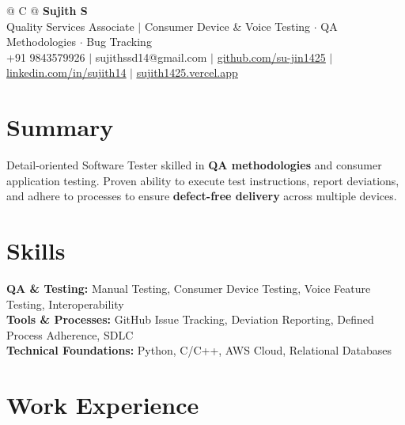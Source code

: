 \documentclass[a4paper,10pt]{article}
\newcommand{\ulink}[2]{\href{#1}{\uline{#2}}}
\begin{document}
\pagestyle{empty}

\begin{tabularx}{\linewidth}{@{} C @{}}
{\color[HTML]{000000}\fontsize{30}{35}\selectfont\bfseries Sujith S} \\[5pt]
{\fontsize{10.5}{12.5}\selectfont\color[HTML]{3A3A3A}
Quality Services Associate $|$ Consumer Device \& Voice Testing $\cdot$ QA Methodologies $\cdot$ Bug Tracking} \\[6pt]
{\fontsize{9.5}{11.5}\selectfont\textcolor[HTML]{3A3A3A}{+91 9843579926 $|$ sujithssd14@gmail.com $|$ \ulink{https://github.com/su-jin1425}{github.com/su-jin1425} $|$ \ulink{https://linkedin.com/in/sujith14}{linkedin.com/in/sujith14} $|$ \ulink{https://sujith1425.vercel.app}{sujith1425.vercel.app}}}
\end{tabularx}

\vspace{2pt}

\section{Summary}
\vspace{1pt}
{\color[HTML]{0A0A0A}\fontsize{11}{14}\selectfont
Detail-oriented Software Tester skilled in \textbf{QA methodologies} and consumer application testing. Proven ability to execute test instructions, report deviations, and adhere to processes to ensure \textbf{defect-free delivery} across multiple devices.}

\vspace{1pt}

\section{Skills}
\vspace{1pt}
{\color[HTML]{0A0A0A}\fontsize{11}{14}\selectfont
\textbf{QA \& Testing:} Manual Testing, Consumer Device Testing, Voice Feature Testing, Interoperability \\[2pt]
\textbf{Tools \& Processes:} GitHub Issue Tracking, Deviation Reporting, Defined Process Adherence, SDLC \\[2pt]
\textbf{Technical Foundations:} Python, C/C++, AWS Cloud, Relational Databases}

\vspace{1pt}

\section{Work Experience}
\vspace{1pt}
\end{document}
